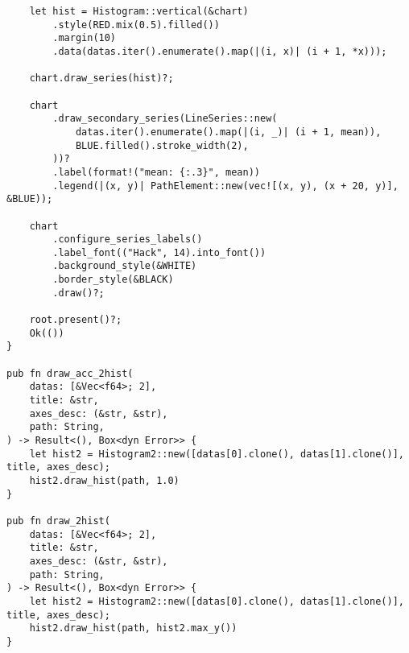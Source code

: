 \begin{code}
\begin{verbatim}
    let hist = Histogram::vertical(&chart)
        .style(RED.mix(0.5).filled())
        .margin(10)
        .data(datas.iter().enumerate().map(|(i, x)| (i + 1, *x)));

    chart.draw_series(hist)?;

    chart
        .draw_secondary_series(LineSeries::new(
            datas.iter().enumerate().map(|(i, _)| (i + 1, mean)),
            BLUE.filled().stroke_width(2),
        ))?
        .label(format!("mean: {:.3}", mean))
        .legend(|(x, y)| PathElement::new(vec![(x, y), (x + 20, y)], &BLUE));

    chart
        .configure_series_labels()
        .label_font(("Hack", 14).into_font())
        .background_style(&WHITE)
        .border_style(&BLACK)
        .draw()?;

    root.present()?;
    Ok(())
}

pub fn draw_acc_2hist(
    datas: [&Vec<f64>; 2],
    title: &str,
    axes_desc: (&str, &str),
    path: String,
) -> Result<(), Box<dyn Error>> {
    let hist2 = Histogram2::new([datas[0].clone(), datas[1].clone()], title, axes_desc);
    hist2.draw_hist(path, 1.0)
}

pub fn draw_2hist(
    datas: [&Vec<f64>; 2],
    title: &str,
    axes_desc: (&str, &str),
    path: String,
) -> Result<(), Box<dyn Error>> {
    let hist2 = Histogram2::new([datas[0].clone(), datas[1].clone()], title, axes_desc);
    hist2.draw_hist(path, hist2.max_y())
}


\end{verbatim}
\end{code}
